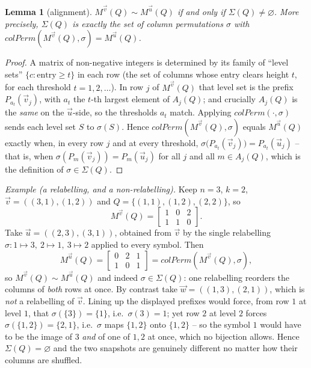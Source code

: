 \documentclass{article}
\newtheorem{lemma}[theorem]{Lemma}
\begin{document}
\begin{lemma}[alignment]\label{lem:align}
$M^{\vec v}(Q)\sim M^{\vec u}(Q)$ if and only if $\Sigma(Q)\neq\varnothing$.  More
precisely, $\Sigma(Q)$ is \emph{exactly} the set of column permutations $\sigma$
with $colPerm(M^{\vec v}(Q),\sigma)=M^{\vec u}(Q)$.
\end{lemma}

\begin{proof}
A matrix of non-negative integers is determined by its family of
``level sets'' $\{c:\text{entry}\ge t\}$ in each row (the set of columns whose entry
clears height $t$, for each threshold $t=1,2,\ldots$).  In row $j$ of
$M^{\vec v}(Q)$ that level set is the prefix $P_{a_t}(\vec v_j)$, with $a_t$ the
$t$-th largest element of $A_j(Q)$; and crucially $A_j(Q)$ is the \emph{same} on
the $\vec u$-side, so the thresholds $a_t$ match.  Applying $colPerm(\cdot,\sigma)$
sends each level set $S$ to $\sigma(S)$.  Hence $colPerm(M^{\vec v}(Q),\sigma)$
equals $M^{\vec u}(Q)$ exactly when, in every row $j$ and at every threshold,
$\sigma\bigl(P_{a_t}(\vec v_j)\bigr)=P_{a_t}(\vec u_j)$ -- that is, when
$\sigma(P_m(\vec v_j))=P_m(\vec u_j)$ for all $j$ and all $m\in A_j(Q)$, which is the
definition of $\sigma\in\Sigma(Q)$.
\end{proof}

\noindent\textit{Example (a relabelling, and a non-relabelling).}  Keep
$n=3$, $k=2$, $\vec v=((3,1),(1,2))$ and $Q=\{(1,1),(1,2),(2,2)\}$, so
\[
M^{\vec v}(Q)=\begin{bmatrix}1&0&2\\1&1&0\end{bmatrix}.
\]
Take $\vec u=((2,3),(3,1))$, obtained from $\vec v$ by the single relabelling
$\sigma:1\mapsto3,\ 2\mapsto1,\ 3\mapsto2$ applied to every symbol.  Then
\[
M^{\vec u}(Q)=\begin{bmatrix}0&2&1\\1&0&1\end{bmatrix}
=colPerm\!\left(M^{\vec v}(Q),\sigma\right),
\]
so $M^{\vec v}(Q)\sim M^{\vec u}(Q)$ and indeed $\sigma\in\Sigma(Q)$: one
relabelling reorders the columns of \emph{both} rows at once.  By contrast take
$\vec w=((1,3),(2,1))$, which is \emph{not} a relabelling of $\vec v$.  Lining up
the displayed prefixes would force, from row $1$ at level $1$, that
$\sigma(\{3\})=\{1\}$, i.e.\ $\sigma(3)=1$; yet row $2$ at level $2$ forces
$\sigma(\{1,2\})=\{2,1\}$, i.e.\ $\sigma$ maps $\{1,2\}$ onto $\{1,2\}$ -- so the
symbol $1$ would have to be the image of $3$ \emph{and} of one of $1,2$ at once,
which no bijection allows.  Hence $\Sigma(Q)=\varnothing$ and the two snapshots are
genuinely different no matter how their columns are shuffled.
\end{document}
